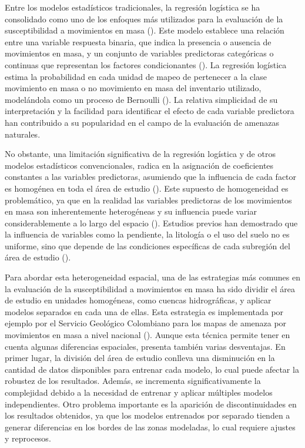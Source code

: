 \documentclass[
  manuscript=article,  
  layout=preprint,  
]{format}
\begin{document}
Entre los modelos estadísticos tradicionales, la regresión logística se ha consolidado como uno de los enfoques más utilizados para la evaluación de la susceptibilidad a movimientos en masa (\cite{budimir2015systematic, reichenbach2018}). Este modelo establece una relación entre una variable respuesta binaria, que indica la presencia o ausencia de movimientos en masa, y un conjunto de variables predictoras categóricas o continuas que representan los factores condicionantes (\cite{ayalew2005application}). La regresión logística estima la probabilidad en cada unidad de mapeo de pertenecer a la clase movimiento en masa o no movimiento en masa del inventario utilizado, modelándola como un proceso de Bernoulli (\cite{ayalew2005application}). La relativa simplicidad de su interpretación y la facilidad para identificar el efecto de cada variable predictora han contribuido a su popularidad en el campo de la evaluación de amenazas naturales.

No obstante, una limitación significativa de la regresión logística y de otros modelos estadísticos convencionales, radica en la asignación de coeficientes constantes a las variables predictoras, asumiendo que la influencia de cada factor es homogénea en toda el área de estudio (\cite{anselin1996simple, cressie2015statistics}). Este supuesto de homogeneidad es problemático, ya que en la realidad las variables predictoras de los movimientos en masa son inherentemente heterogéneas y su influencia puede variar considerablemente a lo largo del espacio (\cite{petschko2012landslide}). Estudios previos han demostrado que la influencia de variables como la pendiente, la litología o el uso del suelo no es uniforme, sino que depende de las condiciones específicas de cada subregión del área de estudio (\cite{lombardo2020space}).

Para abordar esta heterogeneidad espacial, una de las estrategias más comunes en la evaluación de la susceptibilidad a movimientos en masa ha sido dividir el área de estudio en unidades homogéneas, como cuencas hidrográficas, y aplicar modelos separados en cada una de ellas. Esta estrategia es implementada por ejemplo por el Servicio Geológico Colombiano para los mapas de amenaza por movimientos en masa a nivel nacional (\cite{colombiano2013documento}). Aunque esta técnica permite tener en cuenta algunas diferencias espaciales, presenta también varias desventajas. En primer lugar, la división del área de estudio conlleva una disminución en la cantidad de datos disponibles para entrenar cada modelo, lo cual puede afectar la robustez de los resultados. Además, se incrementa significativamente la complejidad debido a la necesidad de entrenar y aplicar múltiples modelos independientes. Otro problema importante es la aparición de discontinuidades en los resultados obtenidos, ya que los modelos entrenados por separado tienden a generar diferencias en los bordes de las zonas modeladas, lo cual requiere ajustes y reprocesos.
\end{document}
